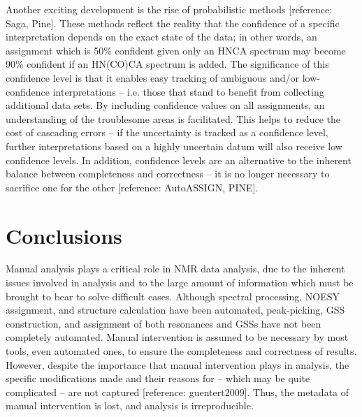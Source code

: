 Another exciting development is the rise of probabilistic methods 
[reference: Saga, Pine].  These methods reflect the reality that the 
confidence of a specific interpretation depends on the exact state of the 
data; in other words, an assignment which is 50\% confident given only an 
HNCA spectrum may become 90\% confident if an HN(CO)CA spectrum is added.  
The significance of this confidence level is that it enables easy tracking 
of ambiguous and/or low-confidence interpretations -- i.e. those that stand 
to benefit from collecting additional data sets.  By including confidence 
values on all assignments, an understanding of the troublesome areas is 
facilitated.  This helps to reduce the cost of cascading errors -- if the 
uncertainty is tracked as a confidence level, further interpretations based 
on a highly uncertain datum will also receive low confidence levels.  In 
addition, confidence levels are an alternative to the inherent balance 
between completeness and correctness -- it is no longer necessary to 
sacrifice one for the other [reference: AutoASSIGN, PINE].


\section{Conclusions}

Manual analysis plays a critical role in NMR data analysis, due to the inherent 
issues involved in analysis and to the large amount of information which must 
be brought to bear to solve difficult cases.  Although spectral processing, 
NOESY assignment, and structure calculation have been automated, peak-picking, 
GSS construction, and assignment of both resonances and GSSs have not been 
completely automated.  Manual intervention is assumed to be necessary by 
most tools, even automated ones, to ensure the completeness and correctness 
of results.  However, despite the importance that manual intervention plays 
in analysis, the specific modifications made and their reasons for -- 
which may be quite complicated -- are not captured [reference: guentert2009].  
Thus, the metadata of manual intervention is lost, and analysis is 
irreproducible.


